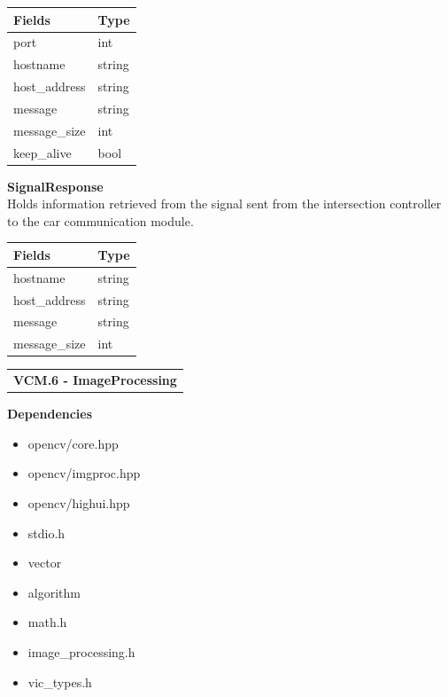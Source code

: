 \documentclass [10pt]{article}
\begin{document}

\begin{longtable}{ p{ }  p{ }} \\ 
    \rowcolor{tableCell}\textbf{Fields} & \textbf{Type} \\ \hline
    \rowcolor{tableCell}port & int \\ \hline
    \rowcolor{tableCell}hostname & string \\ \hline
    \rowcolor{tableCell}host\_address & string \\ \hline
    \rowcolor{tableCell}message & string \\ \hline
    \rowcolor{tableCell}message\_size & int \\ \hline
    \rowcolor{tableCell}keep\_alive & bool \\ \hline
\end{longtable}


\textbf{SignalResponse}\\
\indent \indent Holds information retrieved from the signal sent from the intersection controller to the car communication module. \\


\begin{longtable}{ p{ }  p{ }} \\ 
    \rowcolor{tableCell}\textbf{Fields} & \textbf{Type} \\ \hline
    \rowcolor{tableCell}hostname & string \\ \hline
    \rowcolor{tableCell}host\_address & string \\ \hline
    \rowcolor{tableCell}message & string \\ \hline
    \rowcolor{tableCell}message\_size & int \\ \hline
\end{longtable}



\begin{longtable}{p{}}

\rowcolor{subsectionC}\textbf{VCM.6 - ImageProcessing} \\
\end{longtable}



\textbf{Dependencies} 
\begin{itemize} 
\itemsep 0em 
\item opencv/core.hpp
\item opencv/imgproc.hpp
\item opencv/highui.hpp
\item stdio.h
\item vector
\item algorithm
\item math.h
\item image\_processing.h
\item vic\_types.h
\end{itemize}
\end{document}

